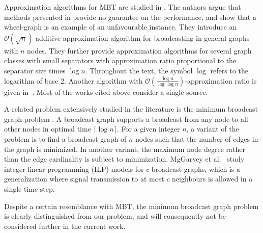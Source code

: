 Approximation algorithms for MBT are studied in \cite{kortsarz95}. 
The authors argue that methods presented in \cite{scheuermann84} provide no guarantee on the performance, and show that a wheel-graph is an example of an unfavourable instance.
They introduce an $\mathcal{O}(\sqrt{n})$-additive approximation algorithm for broadcasting in general graphs with $n$ nodes.
They further provide approximation algorithms for several graph classes with small separators with approximation ratio proportional to the separator size times $\log n$.
Throughout the text, the symbol $\log$ refers to the logarithm of base 2.
Another algorithm with $\mathcal{O}\left(\frac{\log n}{\log \log n}\right)$-approximation ratio is given in~\cite{elkin03}.
Most of the works cited above consider a single source.

A related problem extensively studied in the literature is the minimum broadcast graph problem \cite{grigni91,mcgarvey16}. 
A broadcast graph supports a broadcast from any node to all other nodes in optimal time $\lceil\log n\rceil$.
For a given integer $n$, a variant of the problem is to find a broadcast graph of $n$ nodes such that the number of edges in the graph is minimized.
In another variant, the maximum node degree rather than the edge cardinality is subject to minimization.
MgGarvey et al.\ \cite{mcgarvey16} study integer linear programming (ILP) models for $c$-broadcast graphs, which is a generalization where signal transmission to at most $c$ neighbours is allowed in a single time step.

Despite a certain resemblance with MBT, the minimum broadcast graph problem is clearly distinguished from our problem,
and will consequently not be considered further in the current work.
